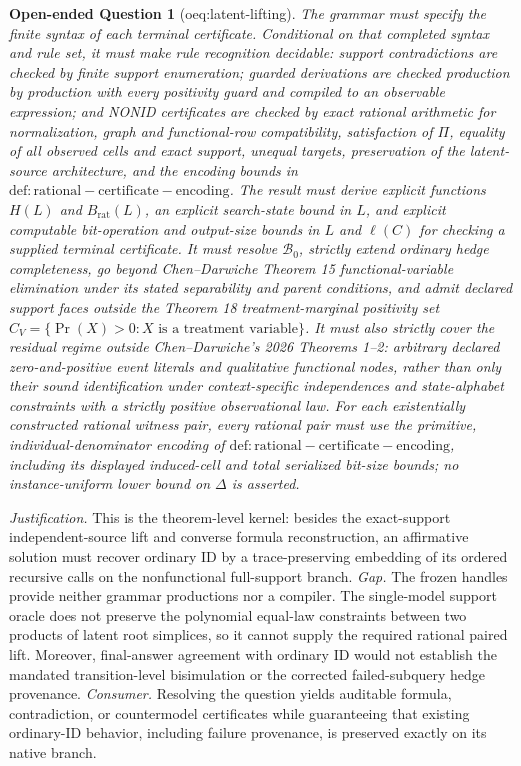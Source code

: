 \documentclass{article}
\newtheorem{openendedquestion}{Open-ended Question}
\begin{document}
\begin{openendedquestion}[oeq:latent-lifting]
The grammar must specify the finite syntax of each terminal certificate. Conditional on that completed syntax and rule set, it must make rule recognition decidable: support contradictions are checked by finite support enumeration; guarded derivations are checked production by production with every positivity guard and compiled to an observable expression; and NONID certificates are checked by exact rational arithmetic for normalization, graph and functional-row compatibility, satisfaction of \(\Pi\), equality of all observed cells and exact support, unequal targets, preservation of the latent-source architecture, and the encoding bounds in \(\mathrm{def:rational-certificate-encoding}\). The result must derive explicit functions \(H(L)\) and \(B_{\mathrm{rat}}(L)\), an explicit search-state bound in \(L\), and explicit computable bit-operation and output-size bounds in \(L\) and \(\ell(C)\) for checking a supplied terminal certificate. It must resolve \(\mathcal B_0\), strictly extend ordinary hedge completeness, go beyond Chen--Darwiche Theorem 15 functional-variable elimination under its stated separability and parent conditions, and admit declared support faces outside the Theorem 18 treatment-marginal positivity set \(C_V=\{\Pr(X)>0:X\text{ is a treatment variable}\}\). It must also strictly cover the residual regime outside Chen--Darwiche's 2026 Theorems 1--2: arbitrary declared zero-and-positive event literals and qualitative functional nodes, rather than only their sound identification under context-specific independences and state-alphabet constraints with a strictly positive observational law. For each existentially constructed rational witness pair, every rational pair must use the primitive, individual-denominator encoding of \(\mathrm{def:rational-certificate-encoding}\), including its displayed induced-cell and total serialized bit-size bounds; no instance-uniform lower bound on \(\Delta\) is asserted.
\end{openendedquestion}
\par\smallskip\noindent \textit{Justification.} This is the theorem-level kernel: besides the exact-support independent-source lift and converse formula reconstruction, an affirmative solution must recover ordinary ID by a trace-preserving embedding of its ordered recursive calls on the nonfunctional full-support branch. \textit{Gap.} The frozen handles provide neither grammar productions nor a compiler. The single-model support oracle does not preserve the polynomial equal-law constraints between two products of latent root simplices, so it cannot supply the required rational paired lift. Moreover, final-answer agreement with ordinary ID would not establish the mandated transition-level bisimulation or the corrected failed-subquery hedge provenance. \textit{Consumer.} Resolving the question yields auditable formula, contradiction, or countermodel certificates while guaranteeing that existing ordinary-ID behavior, including failure provenance, is preserved exactly on its native branch.
\end{document}
